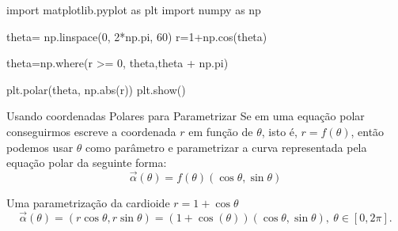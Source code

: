 \begin{frame}[label=fun-vet,fragile=singleslide]
\begin{block}{ }
\begin{pyverbatim}
import matplotlib.pyplot as plt
import numpy as np

theta= np.linspace(0, 2*np.pi, 60)
r=1+np.cos(theta)

theta=np.where(r >= 0, theta,theta + np.pi)

plt.polar(theta, np.abs(r))
plt.show()
\end{pyverbatim}
\end{block}


\end{frame}


\begin{frame}[label=fun-vet]
\end{frame}

\begin{frame}[label=fun-vet]{Usando coordenadas Polares para Parametrizar}
Se em uma equação polar conseguirmos escreve a coordenada $r$ em função de $\theta$, isto é, $r=f(\theta)$, então podemos usar $\theta$ como parâmetro e parametrizar a curva representada pela equação polar da seguinte forma:
\[\vec{\alpha}(\theta)=f(\theta)(\cos \theta,\sin \theta)\]

\begin{exe}
Uma parametrização da cardioide $r=1+\cos \theta$ 
\[\vec{\alpha}(\theta)=(r\cos \theta,r\sin \theta)=(1+\cos (\theta))(\cos \theta,\sin \theta),\ \theta\in [0,2\pi].\]

\end{exe}
\end{frame}

